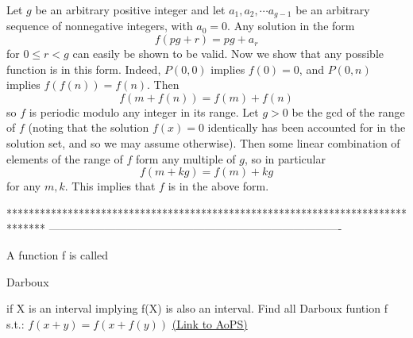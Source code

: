 \begin{solution}
	Let $g$ be an arbitrary positive integer and let $a_1,a_2,\cdots a_{g-1}$ be an arbitrary sequence of nonnegative integers, with $a_0=0$. Any solution in the form
\[
f(pg+r)=pg+a_r
\]
for $0\le r<g$ can easily be shown to be valid. Now we show that any possible function is in this form. Indeed, $P(0,0)$ implies $f(0)=0$, and $P(0,n)$ implies $f(f(n))=f(n)$. Then
\[
f(m+f(n))=f(m)+f(n)
\]
so $f$ is periodic modulo any integer in its range. Let $g>0$ be the gcd of the range of $f$ (noting that the solution $f(x)=0$ identically has been accounted for in the solution set, and so we may assume otherwise). Then some linear combination of elements of the range of $f$ form any multiple of $g$, so in particular
\[
f(m+kg)=f(m)+kg
\]
for any $m,k$. This implies that $f$ is in the above form.
\end{solution}
*******************************************************************************
-------------------------------------------------------------------------------

\begin{problem}
	A function f is called \begin{bolded}Darboux\end{bolded} if X is an interval implying f(X) is also an interval.
Find all Darboux funtion f s.t.:
$f(x+y)=f(x+f(y))$
	\flushright \href{https://artofproblemsolving.com/community/c6h61817}{(Link to AoPS)}
\end{problem}



